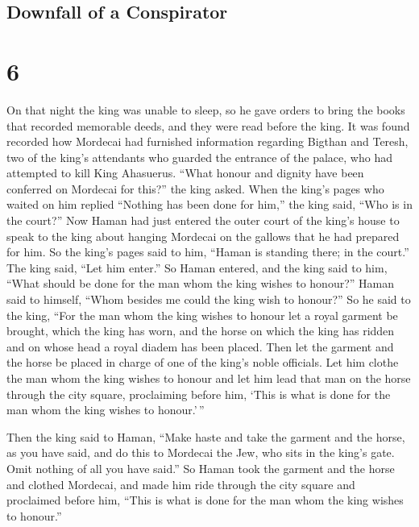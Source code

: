 \hypertarget{downfall-of-a-conspirator}{%
\subsection{Downfall of a Conspirator}\label{downfall-of-a-conspirator}}

\hypertarget{section-5}{%
\section{6}\label{section-5}}

 On that night the king was unable to sleep, so he gave
orders to bring the books that recorded memorable deeds, and they were
read before the king.  It was found recorded how Mordecai
had furnished information regarding Bigthan and Teresh, two of the
king's attendants who guarded the entrance of the palace, who had
attempted to kill King Ahasuerus.  ``What honour and dignity
have been conferred on Mordecai for this?'' the king asked. When the
king's pages who waited on him replied ``Nothing has been done for
him,''  the king said, ``Who is in the court?'' Now Haman
had just entered the outer court of the king's house to speak to the
king about hanging Mordecai on the gallows that he had prepared for him.
 So the king's pages said to him, ``Haman is standing there;
in the court.'' The king said, ``Let him enter.''  So Haman
entered, and the king said to him, ``What should be done for the man
whom the king wishes to honour?'' Haman said to himself, ``Whom besides
me could the king wish to honour?''  So he said to the king,
``For the man whom the king wishes to honour  let a royal
garment be brought, which the king has worn, and the horse on which the
king has ridden and on whose head a royal diadem has been placed.
 Then let the garment and the horse be placed in charge of
one of the king's noble officials. Let him clothe the man whom the king
wishes to honour and let him lead that man on the horse through the city
square, proclaiming before him, `This is what is done for the man whom
the king wishes to honour.'\,''

 Then the king said to Haman, ``Make haste and take the
garment and the horse, as you have said, and do this to Mordecai the
Jew, who sits in the king's gate. Omit nothing of all you have said.''
 So Haman took the garment and the horse and clothed
Mordecai, and made him ride through the city square and proclaimed
before him, ``This is what is done for the man whom the king wishes to
honour.''

